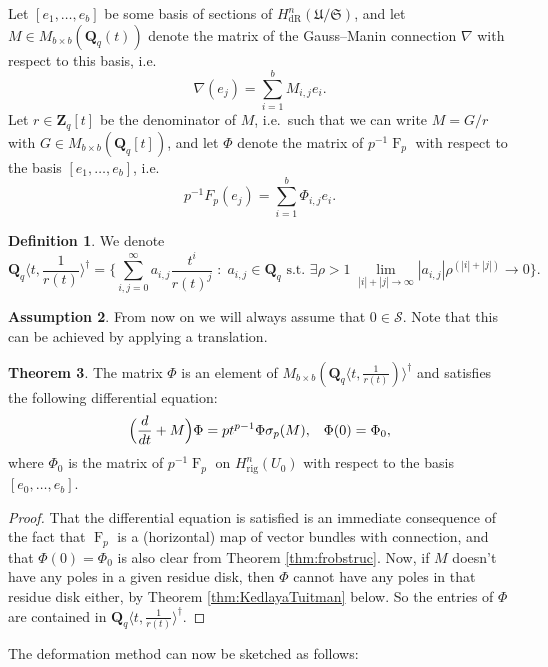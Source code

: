 \documentclass[a4paper,11pt]{article}
\numberwithin{equation}{section}
\newcommand{\ZZ}{\mathbf{Z}} %
\newcommand{\QQ}{\mathbf{Q}} %
\DeclareMathOperator{\Frob}{F}           %
\providecommand{\HdR}{H_{\text{dR}}}    %
\providecommand{\Hrig}{H_{\text{rig}}}  %
\theoremstyle{definition}
\newtheorem{thm}{Theorem}[section]
\newtheorem{defn}[thm]{Definition}
\newtheorem{assump}[thm]{Assumption}
\begin{document}
Let $[e_1, \ldots, e_b]$ be some basis of sections of $\HdR^n(\mathfrak{U}/\mathfrak{S})$, and let 
$M \in M_{b \times b}(\QQ_q(t))$ denote the matrix of the Gauss--Manin connection $\nabla$ with respect 
to this basis, i.e.\ 
\[
\nabla (e_j) = \sum_{i=1}^b M_{i,j} e_i.
\]
Let $r \in \ZZ_q[t]$ be the denominator of $M$, i.e.\ such that we can write $M=G/r$ with $G \in M_{b \times b}(\QQ_q[t])$, 
and let $\Phi$ denote the matrix of $p^{-1}\Frob_p$ with respect to the basis $[e_1, \ldots, e_b]$, i.e.\
\[
p^{-1} F_p (e_j) = \sum_{i=1}^b \Phi_{i,j} e_i.
\]

\begin{defn} We denote
\[
\QQ_q \langle t, \frac{1}{r(t)} \rangle^{\dag} = 
\biggl\{\sum_{i,j=0}^{\infty} a_{i,j} \frac{t^i}{r(t)^j} \; : \; 
a_{i,j} \in \QQ_q \text{ s.t. } \exists \rho > 1 \; 
\lim_{|i|+|j| \rightarrow \infty} |a_{i,j}| \rho^{(|i|+|j|)} \rightarrow 0 
\biggr\}.
\] 
\end{defn}

\begin{assump}
From now on we will always assume that $0 \in \mathcal{S}$. 
Note that this can be achieved by applying a translation.
\end{assump}

\begin{thm} \label{thm:eqphi} The matrix $\Phi$ is an element of $M_{b \times b}(\QQ_q \langle t, \frac{1}{r(t)}) \rangle^{\dag}$ 
and satisfies the following differential equation:
\begin{equation*}
\Bigl(\frac{d}{dt} + M\Bigr) \Phi = p t^{p-1} \Phi \sigma_p(M), \; \; \; \Phi(0)=\Phi_0,
\end{equation*}
where $\Phi_0$ is the matrix of $p^{-1}\Frob_p$ on $\Hrig^n(U_0)$ with respect to the basis
$[e_0,\ldots,e_b]$.
\end{thm}

\begin{proof}
That the differential equation is satisfied is an immediate consequence of the fact that $\Frob_p$ is a
(horizontal) map of vector bundles with connection, and that $\Phi(0)=\Phi_0$ is also clear from Theorem
\ref{thm:frobstruc}. Now, if $M$ doesn't have any poles in a given residue disk, then $\Phi$ cannot have 
any poles in that residue disk either, by Theorem \ref{thm:KedlayaTuitman} below. So the entries 
of $\Phi$ are contained in $\QQ_q \langle t, \frac{1}{r(t)} \rangle^{\dag}$.
\end{proof}

The deformation method can now be sketched as follows:
\end{document}
